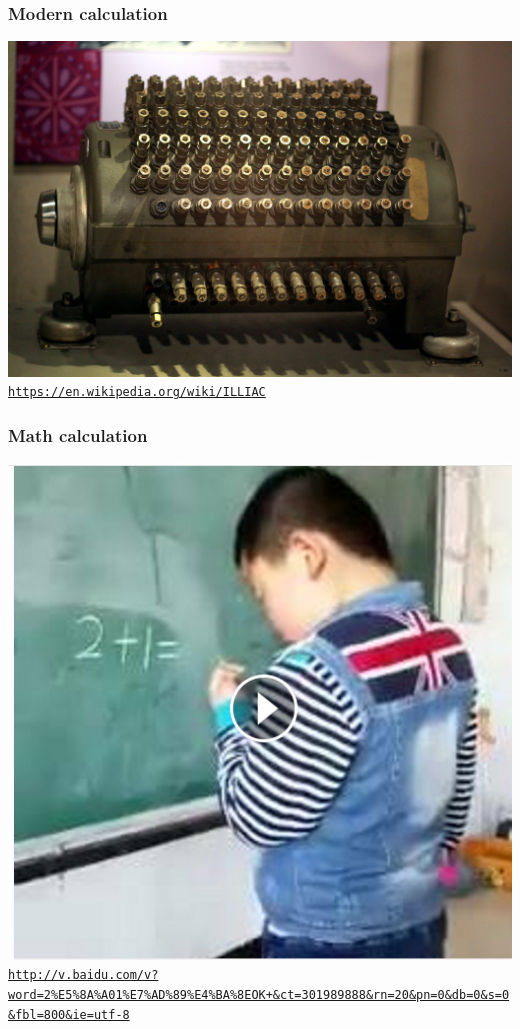 \documentclass[11pt]{beamer}
\begin{document}
\begin{frame}[fragile]
	\frametitle{Modern calculation}
	
	\includegraphics[height=0.75\textheight]{./img/illiac.jpg}\\
	\textcolor{\CSBase}{\small \texttt{\url{https://en.wikipedia.org/wiki/ILLIAC}}}
\end{frame}

\begin{frame}[fragile]
	\frametitle{Math calculation}
	\centering
	\includegraphics[height=0.75\textheight]{./img/2plus1.jpg}\\
	\textcolor{\CSBase}{\small \texttt{\url{http://v.baidu.com/v?word=2\%E5\%8A\%A01\%E7\%AD\%89\%E4\%BA\%8EOK+\&ct=301989888\&rn=20\&pn=0\&db=0\&s=0\&fbl=800\&ie=utf-8}}}
\end{frame}
\end{document}
